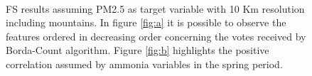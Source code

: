 \begin{figure}[H]
\centering
{}\\
\caption{FS results assuming PM2.5 as target variable with 10 Km resolution including mountains. In figure \ref{fig:a} it is possible to observe the features ordered in decreasing order concerning the votes received by Borda-Count algorithm. Figure \ref{fig:b} highlights the positive correlation assumed by ammonia variables in the spring period. }
\label{fig:fs_pm25}
\end{figure}

